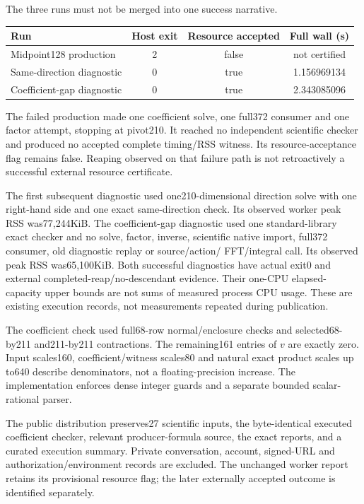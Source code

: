 \documentclass[11pt,a4paper]{article}
\theoremstyle{definition}
\theoremstyle{remark}
\numberwithin{equation}{section}
\begin{document}
The three runs must not be merged into one success narrative.
\begin{center}\small
\begin{tabular}{@{}p{.34\linewidth}ccc@{}}
\toprule
Run & Host exit & Resource accepted & Full wall (s)\\
\midrule
Midpoint128 production &2&false&not certified\\
Same-direction diagnostic &0&true&1.156969134\\
Coefficient-gap diagnostic &0&true&2.343085096\\
\bottomrule
\end{tabular}
\end{center}
The failed production made one coefficient solve, one full372 consumer
and one factor attempt, stopping at pivot210. It reached no independent
scientific checker and produced no accepted complete timing/RSS witness.
Its resource-acceptance flag remains false. Reaping observed on that
failure path is not retroactively a successful external resource certificate.

The first subsequent diagnostic used one210-dimensional direction solve
with one right-hand side and one exact same-direction check. Its observed
worker peak RSS was77,244KiB. The coefficient-gap diagnostic used one
standard-library exact checker and no solve, factor, inverse, scientific
native import, full372 consumer, old diagnostic replay or source/action/
FFT/integral call. Its observed peak RSS was65,100KiB. Both successful
diagnostics have actual exit0 and external completed-reap/no-descendant
evidence. Their one-CPU elapsed-capacity upper bounds are not sums of
measured process CPU usage. These are existing execution records, not
measurements repeated during publication.

The coefficient check used full68-row normal/enclosure checks and
selected68-by211 and211-by211 contractions. The remaining161 entries of
$v$ are exactly zero. Input scales160, coefficient/witness scales80 and
natural exact product scales up to640 describe denominators, not a
floating-precision increase. The implementation enforces dense integer
guards and a separate bounded scalar-rational parser.

The public distribution preserves27 scientific inputs, the byte-identical
executed coefficient checker, relevant producer-formula source, the exact
reports, and a curated execution summary. Private conversation, account,
signed-URL and authorization/environment records are excluded.
The unchanged worker report retains its provisional resource flag;
the later externally accepted outcome is identified separately.
\end{document}
